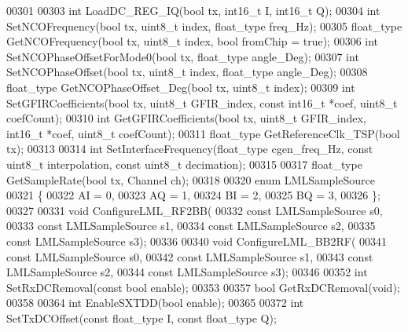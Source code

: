 \begin{DoxyCode}
00301 
00303     \textcolor{keywordtype}{int} LoadDC\_REG\_IQ(\textcolor{keywordtype}{bool} tx, int16\_t I, int16\_t Q);
00304     \textcolor{keywordtype}{int} SetNCOFrequency(\textcolor{keywordtype}{bool} tx, uint8\_t index, float\_type freq\_Hz);
00305     float\_type GetNCOFrequency(\textcolor{keywordtype}{bool} tx, uint8\_t index, \textcolor{keywordtype}{bool} fromChip = \textcolor{keyword}{true});
00306     \textcolor{keywordtype}{int} SetNCOPhaseOffsetForMode0(\textcolor{keywordtype}{bool} tx, float\_type angle\_Deg);
00307     \textcolor{keywordtype}{int} SetNCOPhaseOffset(\textcolor{keywordtype}{bool} tx, uint8\_t index, float\_type angle\_Deg);
00308     float\_type GetNCOPhaseOffset\_Deg(\textcolor{keywordtype}{bool} tx, uint8\_t index);
00309     \textcolor{keywordtype}{int} SetGFIRCoefficients(\textcolor{keywordtype}{bool} tx, uint8\_t GFIR\_index, \textcolor{keyword}{const} int16\_t *coef, uint8\_t coefCount);
00310     \textcolor{keywordtype}{int} GetGFIRCoefficients(\textcolor{keywordtype}{bool} tx, uint8\_t GFIR\_index, int16\_t *coef, uint8\_t coefCount);
00311     float\_type GetReferenceClk\_TSP(\textcolor{keywordtype}{bool} tx);
00313 
00314     \textcolor{keywordtype}{int} SetInterfaceFrequency(float\_type cgen\_freq\_Hz, \textcolor{keyword}{const} uint8\_t interpolation, \textcolor{keyword}{const} uint8\_t 
      decimation);
00315 
00317     float\_type GetSampleRate(\textcolor{keywordtype}{bool} tx, Channel ch);
00318 
00320     \textcolor{keyword}{enum} LMLSampleSource
00321     \{
00322         AI = 0,
00323         AQ = 1,
00324         BI = 2,
00325         BQ = 3,
00326     \};
00327 
00331     \textcolor{keywordtype}{void} ConfigureLML\_RF2BB(
00332         \textcolor{keyword}{const} LMLSampleSource s0,
00333         \textcolor{keyword}{const} LMLSampleSource s1,
00334         \textcolor{keyword}{const} LMLSampleSource s2,
00335         \textcolor{keyword}{const} LMLSampleSource s3);
00336 
00340     \textcolor{keywordtype}{void} ConfigureLML\_BB2RF(
00341         \textcolor{keyword}{const} LMLSampleSource s0,
00342         \textcolor{keyword}{const} LMLSampleSource s1,
00343         \textcolor{keyword}{const} LMLSampleSource s2,
00344         \textcolor{keyword}{const} LMLSampleSource s3);
00346 
00352     \textcolor{keywordtype}{int} SetRxDCRemoval(\textcolor{keyword}{const} \textcolor{keywordtype}{bool} enable);
00353 
00357     \textcolor{keywordtype}{bool} GetRxDCRemoval(\textcolor{keywordtype}{void});
00358     
00364     \textcolor{keywordtype}{int} EnableSXTDD(\textcolor{keywordtype}{bool} enable);
00365 
00372     \textcolor{keywordtype}{int} SetTxDCOffset(\textcolor{keyword}{const} float\_type I, \textcolor{keyword}{const} float\_type Q);

\end{DoxyCode}
